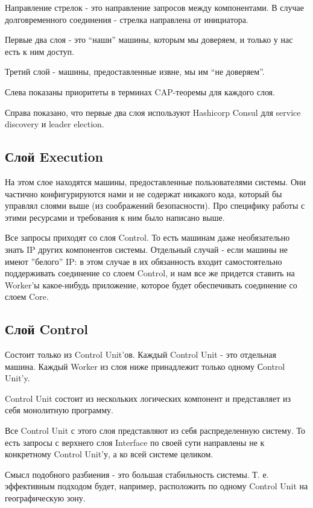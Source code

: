 Направление стрелок - это направление запросов между компонентами. В случае долговременного соединения - стрелка направлена от инициатора.

Первые два слоя - это “наши” машины, которым мы доверяем, и только у нас есть к ним доступ.

Третий слой - машины, предоставленные извне, мы им “не доверяем”.

Слева показаны приоритеты в терминах CAP-теоремы для каждого слоя.

Справа показано, что первые два слоя используют Hashicorp Consul для service discovery и leader election.

\subsection{Слой Execution}

На этом слое находятся машины, предоставленные пользователями системы. Они частично конфигурируются нами и не содержат никакого кода, который бы управлял слоями выше (из соображений безопасности). Про специфику работы с этими ресурсами и требования к ним было написано выше.

Все запросы приходят со слоя Control. То есть машинам даже необязательно знать IP других компонентов системы. Отдельный случай - если машины не имеют ''белого'' IP: в этом случае в их обязанность входит самостоятельно поддерживать соединение со слоем Control, и нам все же придется ставить на Worker'ы какое-нибудь приложение, которое будет обеспечивать соединение со слоем Core.

\subsection{Слой Control}

Состоит только из Control Unit’ов. Каждый Control Unit - это отдельная машина. Каждый Worker из слоя ниже принадлежит только одному Сontrol Unit’y.

Control Unit состоит из нескольких логических компонент и представляет из себя монолитную программу.

Все Control Unit с этого слоя представляют из себя распределенную систему. То есть запросы с верхнего слоя Interface по своей сути направлены не к конкретному Control Unit'у, а ко всей системе целиком.

Смысл подобного разбиения - это большая стабильность системы. Т. е. эффективным подходом будет, например, расположить по одному Control Unit на географическую зону.

